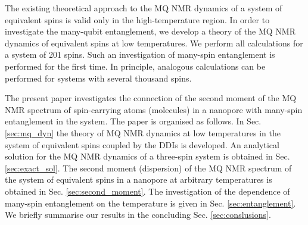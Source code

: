 \par
The existing theoretical approach \cite{lab:mq_nmr_dyn_in_nanopores_2009} to the MQ NMR dynamics of a system of equivalent spins is valid only in the high-temperature region. In order to investigate the many-qubit entanglement, we develop a theory of the MQ NMR dynamics of equivalent spins at low temperatures. 
We perform all calculations for a system of 201 spins. 
Such an investigation of many-spin entanglement is performed for the first time.
In principle, analogous calculations can be performed for  systems with several thousand  spins. 
\par
The present paper investigates the connection of the second moment of the MQ NMR spectrum of spin-carrying atoms (molecules) in a nanopore with many-spin entanglement in the system. The paper is organised as follows. In Sec. \ref{sec:mq_dyn} the theory of MQ NMR dynamics at low temperatures in the system of equivalent spins coupled by the DDIs is developed. An analytical solution for the MQ NMR dynamics of a three-spin system is obtained in Sec. \ref{sec:exact_sol}. The second moment (dispersion) of the MQ NMR spectrum of the system of equivalent spins in a nanopore at arbitrary temperatures is obtained in Sec. \ref{sec:second_moment}. The investigation of the dependence of  many-spin entanglement on the temperature is given in Sec. \ref{sec:entanglement}. We briefly summarise our results in the concluding Sec. \ref{sec:conslusions}.
